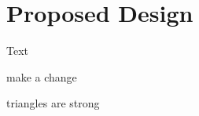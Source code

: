 \documentclass[../main.tex]{subfiles}
\begin{document}
\chapter{Proposed Design}
Text

make a change

triangles are strong
\end{document}

